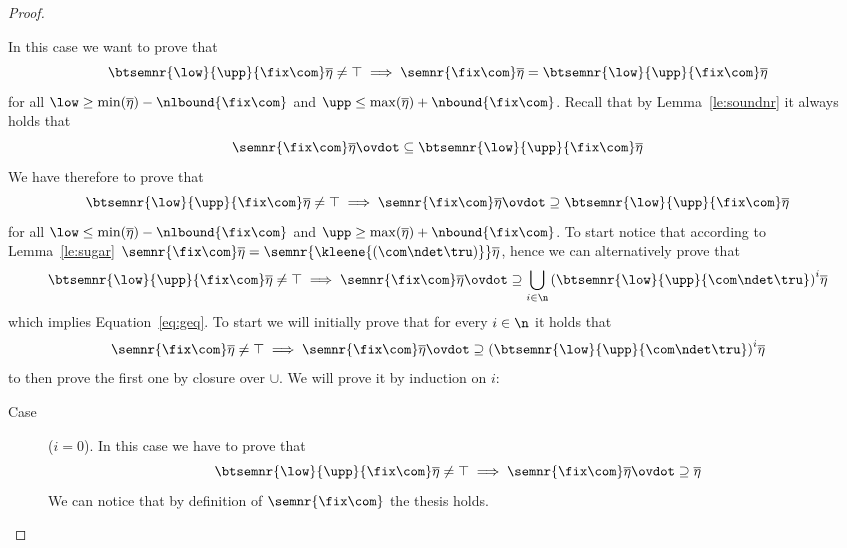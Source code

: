 \begin{proof}
\begin{inductive}
    \case{\(\fix\com\)} In this case we want to prove that
    \begin{equation*}
      \btsemnr{\low}{\upp}{\fix\com}\overline\eta \neq \top
      \implies
      \semnr{\fix\com}\overline\eta = \btsemnr{\low}{\upp}{\fix\com}\overline\eta
    \end{equation*}
    for all \(\low \geq \min(\overline\eta) - \nlbound{\fix\com}\) and
    \(\upp \leq \max(\overline\eta) + \nbound{\fix\com}\). Recall that by
    Lemma~\ref{le:soundnr} it always holds that
    \begin{equation*}
      \semnr{\fix\com}\overline\eta \ovdot\subseteq \btsemnr{\low}{\upp}{\fix\com}\overline\eta
    \end{equation*}
    We have therefore to prove that 
    \begin{equation}\label{eq:geq}
      \btsemnr{\low}{\upp}{\fix\com}\overline\eta \neq \top
      \implies
      \semnr{\fix\com}\overline\eta \ovdot\supseteq \btsemnr{\low}{\upp}{\fix\com}\overline\eta
    \end{equation}
    for all \(\low \leq \min(\overline\eta) - \nlbound{\fix\com}\) and
    \(\upp \geq \max(\overline\eta) + \nbound{\fix\com}\). To start notice that
    according to Lemma~\ref{le:sugar}
    \(\semnr{\fix\com}\overline\eta = \semnr{\kleene{(\com\ndet\tru)}}\overline\eta\),
    hence we can alternatively prove that
    \begin{equation*}
      \btsemnr{\low}{\upp}{\fix\com}\overline\eta\neq \top
      \implies
      \semnr{\fix\com}\overline\eta
      \ovdot\supseteq
      \bigcup_{i\in\n} {\left(\btsemnr{\low}{\upp}{\com \ndet \tru}\right)}^i\overline\eta
    \end{equation*}
    which implies Equation~\ref{eq:geq}. To start we will initially
    prove that for every \(i\in\n\) it holds that
    \begin{equation*}
      \semnr{\fix\com}\overline\eta \neq \top
      \implies
      \semnr{\fix\com}\overline\eta \ovdot\supseteq
      {\left(\btsemnr{\low}{\upp}{\com \ndet \tru}\right)}^i\overline\eta
    \end{equation*}
    to then prove the first one by closure over \(\cup\). We will
    prove it by induction on \(i\):
    \begin{description}
      
    \item[Case] (\(i=0\)). In this case we have to prove that
      \begin{equation*}
        \btsemnr{\low}{\upp}{\fix\com}\overline\eta \neq \top
        \implies
        \semnr{\fix\com}\overline\eta \ovdot\supseteq \overline\eta
      \end{equation*}
      We can notice that by definition of \(\semnr{\fix\com}\) the
      thesis holds.
      

\end{description}
\end{inductive}
\end{proof}
